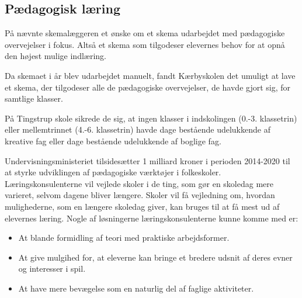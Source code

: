 \subsection{Pædagogisk læring}
\label{paedagogisk_laering}
På \school nævnte skemalæggeren et ønske om et skema udarbejdet med pædagogiske overvejelser i fokus. Altså et skema som tilgodeser elevernes behov for at opnå den højest mulige indlæring.

Da skemaet i år blev udarbejdet manuelt, fandt Kærbyskolen det umuligt at lave et skema, der tilgodeser alle de pædagogiske overvejelser, de havde gjort sig, for samtlige klasser\cite{interview_Kaerby}.

På Tingstrup skole sikrede de sig, at ingen klasser i indskolingen (0.-3. klassetrin) eller mellemtrinnet (4.-6. klassetrin) havde dage bestående udelukkende af kreative fag eller dage bestående udelukkende af boglige fag. 

Undervisningsministeriet tilsidesætter 1 milliard kroner i perioden 2014-2020 til at styrke udviklingen af pædagogiske værktøjer i folkeskoler. Læringskonsulenterne vil vejlede skoler i de ting, som gør en skoledag mere varieret, selvom dagene bliver længere. Skoler vil få vejledning om, hvordan mulighederne, som en længere skoledag giver, kan bruges til at få mest ud af elevernes læring. Nogle af løsningerne læringskonsulenterne kunne komme med er:
\begin{itemize}
\item At blande formidling af teori med praktiske arbejdsformer.
\item At give mulgihed for, at eleverne kan bringe et bredere udsnit af deres evner og interesser i spil.
\item At have mere bevægelse som en naturlig del af faglige aktiviteter\cite{Paedagogisklaering}.

\end{itemize}